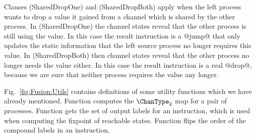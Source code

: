 Clauses (SharedDropOne) and (SharedDropBoth) apply when the left process wants to drop a value it gained from a channel which is shared by the other process. In (SharedDropOne) the channel states reveal that the other process is still using the value. In this case the result instruction is a @jump@ that only updates the static information that the left source process no longer requires this value. In (SharedDropBoth) then channel states reveal that the other process no longer needs the value either. In this case the result instruction is a real @drop@, because we are sure that neither process requires the value any longer.




\smallskip
Fig.~\ref{fig:Fusion:Utils} contains definitions of some utility functions which we have already mentioned.
Function  computes the $\ChanType_2$ map for a pair of processes.
Function  gets the set of output labels for an instruction, which is used when computing the fixpoint of reachable states.
Function  flips the order of the compound labels in an instruction.
